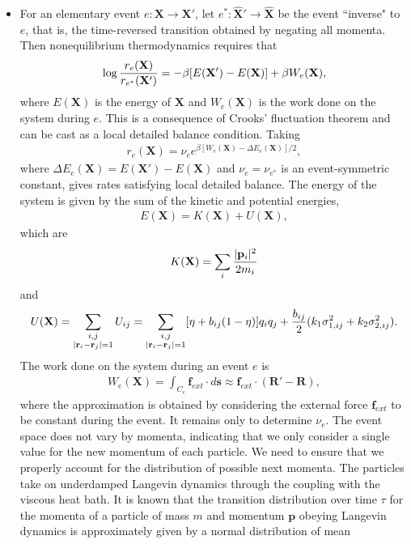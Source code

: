 \documentclass[12pt,letterpaper]{article}
\newcommand{\mb}{\mathbf}
\begin{document}
\begin{itemize}
\item For an elementary event $e: \mb{X} \rightarrow \mb{X}'$, let $e^{*}: \hat{\mb{X}}' \rightarrow \hat{\mb{X}}$ be the event ``inverse" to $e$, that is, the time-reversed transition obtained by negating all momenta. Then nonequilibrium thermodynamics requires that
\begin{align*}
\log{r_{e}(\mb{X}) \over r_{e^{*}}(\mb{X}')} = -\beta[E(\mb{X}') - E(\mb{X})] + \beta W_{e}(\mb{X}),
\end{align*}
where $E(\mb{X})$ is the energy of $\mb{X}$ and $W_{e}(\mb{X})$ is the work done on the system during $e$. This is a consequence of Crooks' fluctuation theorem and can be cast as a local detailed balance condition. Taking
\begin{align*}
r_{e}(\mb{X}) = \nu_{e}e^{\beta[W_{e}(\mb{X}) - \Delta E_{e}(\mb{X})]/2},
\end{align*}
where $\Delta E_{e}(\mb{X}) = E(\mb{X}') - E(\mb{X})$ and $\nu_{e} = \nu_{e^{*}}$ is an event-symmetric constant, gives rates satisfying local detailed balance. The energy of the system is given by the sum of the kinetic and potential energies,
\begin{align*}
E(\mb{X}) = K(\mb{X}) + U(\mb{X}),
\end{align*}
which are
\begin{align*}
K(\mb{X}) = \sum_{i}{|\mb{p}_{i}|^{2} \over 2m_{i}}
\end{align*}
and
\begin{align*}
U(\mb{X}) = \sum_{\substack{i,j \\ |\mb{r}_{i} - \mb{r}_{j}| = 1}}U_{ij} = \sum_{\substack{i,j \\ |\mb{r}_{i} - \mb{r}_{j}| = 1}}[\eta + b_{ij}(1 - \eta)]q_{i}q_{j} + {b_{ij} \over 2}(k_{1}\sigma_{1,ij}^{2} + k_{2}\sigma_{2,ij}^{2}).
\end{align*}
The work done on the system during an event $e$ is
\begin{align*}
W_{e}(\mb{X}) = \int_{C_{e}}\mb{f}_{ext} \cdot d\mb{s} \approx \mb{f}_{ext} \cdot (\mb{R}' - \mb{R}),
\end{align*}
where the approximation is obtained by considering the external force $\mb{f}_{ext}$ to be constant during the event. It remains only to determine $\nu_{e}$. The event space does not vary by momenta, indicating that we only consider a single value for the new momentum of each particle. We need to ensure that we properly account for the distribution of possible next momenta. The particles take on underdamped Langevin dynamics through the coupling with the viscous heat bath. It is known that the transition distribution over time $\tau$ for the momenta of a particle of mass $m$ and momentum $\mb{p}$ obeying Langevin dynamics is approximately given by a normal distribution of mean

\end{itemize}
\end{document}
